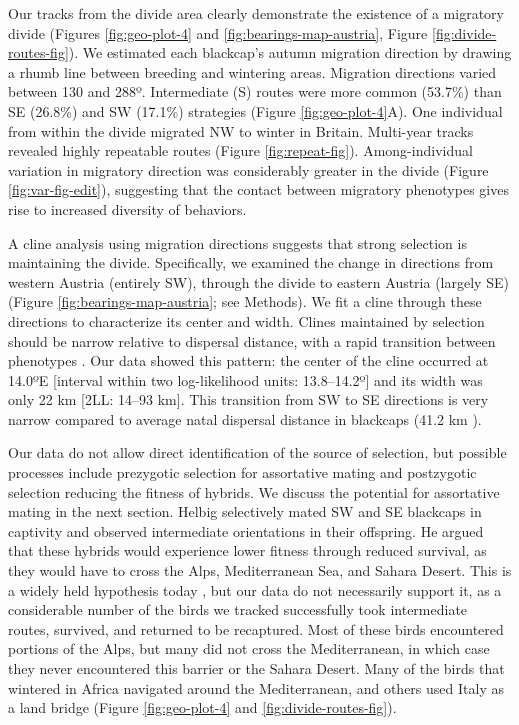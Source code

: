 \documentclass[a4paper, twoside]{templates/ociamthesis}
\begin{document}
Our tracks from the divide area clearly demonstrate the existence of a migratory divide (Figures \ref{fig:geo-plot-4} and \ref{fig:bearings-map-austria}, Figure \ref{fig:divide-routes-fig}). We estimated each blackcap's autumn migration direction by drawing a rhumb line between breeding and wintering areas. Migration directions varied between 130 and 288º. Intermediate (S) routes were more common (53.7\%) than SE (26.8\%) and SW (17.1\%) strategies (Figure \ref{fig:geo-plot-4}A). One individual from within the divide migrated NW to winter in Britain. Multi-year tracks revealed highly repeatable routes (Figure \ref{fig:repeat-fig}). Among-individual variation in migratory direction was considerably greater in the divide (Figure \ref{fig:var-fig-edit}), suggesting that the contact between migratory phenotypes gives rise to increased diversity of behaviors.

A cline analysis using migration directions suggests that strong selection is maintaining the divide. Specifically, we examined the change in directions from western Austria (entirely SW), through the divide to eastern Austria (largely SE) (Figure \ref{fig:bearings-map-austria}; see Methods). We fit a cline through these directions to characterize its center and width. Clines maintained by selection should be narrow relative to dispersal distance, with a rapid transition between phenotypes \autocite{bartonGeneticAnalysisHybrid1993}. Our data showed this pattern: the center of the cline occurred at 14.0ºE {[}interval within two log-likelihood units: 13.8--14.2º{]} and its width was only 22 km {[}2LL: 14--93 km{]}. This transition from SW to SE directions is very narrow compared to average natal dispersal distance in blackcaps (41.2 km \autocite{paradisPatternsNatalBreeding1998}).

Our data do not allow direct identification of the source of selection, but possible processes include prezygotic selection for assortative mating and postzygotic selection reducing the fitness of hybrids. We discuss the potential for assortative mating in the next section. Helbig \autocite{helbigInheritanceMigratoryDirection1991} selectively mated SW and SE blackcaps in captivity and observed intermediate orientations in their offspring. He argued that these hybrids would experience lower fitness through reduced survival, as they would have to cross the Alps, Mediterranean Sea, and Sahara Desert. This is a widely held hypothesis today \autocite{benschGeneticMorphologicalFeather2009,helbigInheritanceMigratoryDirection1991,irwinSiberianMigratoryDivides2005}, but our data do not necessarily support it, as a considerable number of the birds we tracked successfully took intermediate routes, survived, and returned to be recaptured. Most of these birds encountered portions of the Alps, but many did not cross the Mediterranean, in which case they never encountered this barrier or the Sahara Desert. Many of the birds that wintered in Africa navigated around the Mediterranean, and others used Italy as a land bridge (Figure \ref{fig:geo-plot-4} and \ref{fig:divide-routes-fig}).
\end{document}
